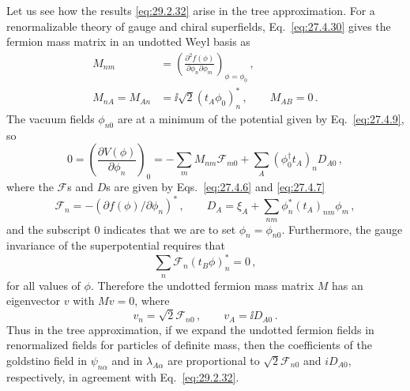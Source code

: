 Let us see how the results \eqref{eq:29.2.32} arise in the tree
approximation. For a renormalizable theory of gauge and chiral
superfields, Eq.~\eqref{eq:27.4.30} gives the fermion mass matrix in an
undotted Weyl basis as
\begin{equation}
  \begin{aligned}
  M_{nm}
  &=
  \left(
    \frac{\partial^2f(\phi)}
         {\partial\phi_n\partial\phi_m}
  \right)_{\phi=\phi_0}\,,
  \\
  M_{nA}=M_{An}
  &=\ii\sqrt{2}(t_A\phi_0)_n^*\,,
  \qquad
  M_{AB}=0\,.
  \end{aligned}
  \tag{29.2.33}\label{eq:29.2.33}
\end{equation}
The vacuum fields \(\phi_{n0}\) are at a minimum of the potential given
by Eq.~\eqref{eq:27.4.9}, so
\begin{equation}
  0
  =
  \left(\frac{\partial V(\phi)}{\partial\phi_n}\right)_0
  =
  -\sum_m M_{nm}\mathcal{F}_{m0}
  +\sum_A(\phi_0^\dagger t_A)_nD_{A0}\,,
  \tag{29.2.34}\label{eq:29.2.34}
\end{equation}
where the \(\mathcal{F}\)s and \(D\)s are given by
Eqs.~\eqref{eq:27.4.6} and \eqref{eq:27.4.7}
\[
  \mathcal{F}_n
  =-\left(\partial f(\phi)/\partial\phi_n\right)^*\,,
  \qquad
  D_A
  =\xi_A+\sum_{nm}\phi_n^*(t_A)_{nm}\phi_m\,,
\]
and the subscript 0 indicates that we are to set
\(\phi_n=\phi_{n0}\). Furthermore, the gauge invariance of the
superpotential requires that
\begin{equation}
  \sum_n\mathcal{F}_n(t_B\phi)_n^*=0\,,
  \tag{29.2.35}\label{eq:29.2.35}
\end{equation}
for all values of \(\phi\). Therefore the undotted fermion mass matrix
\(M\) has an eigenvector \(v\) with \(Mv=0\), where
\begin{equation}
  v_n=\sqrt{2}\mathcal{F}_{n0}\,,
  \qquad
  v_A=\ii D_{A0}\,.
  \tag{29.2.36}\label{eq:29.2.36}
\end{equation}
Thus in the tree approximation, if we expand the undotted fermion
fields in renormalized fields for particles of definite mass, then the
coefficients of the goldstino field in \(\psi_{n\alpha}\) and in
\(\lambda_{A\alpha}\) are proportional to \(\sqrt{2}\mathcal{F}_{n0}\) and
\(iD_{A0}\), respectively, in agreement with Eq.~\eqref{eq:29.2.32}.

